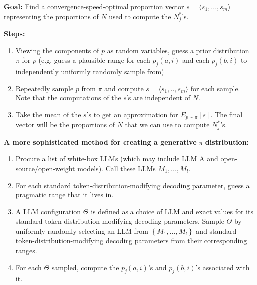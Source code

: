 \documentclass{article}
\begin{document}
\textbf{Goal: }Find a convergence-speed-optimal proportion vector $\displaystyle s=\langle s_{1} ,...,s_{m} \rangle $ representing the proportions of $\displaystyle N$ used to compute the $\displaystyle N_{j}^{*}$'s.

\textbf{Steps:}
\begin{enumerate}
\item Viewing the components of $\displaystyle p$ as random variables, guess a prior distribution $\displaystyle \pi $ for $\displaystyle p$ (e.g. guess a plausible range for each $\displaystyle p_{j}\left( a,i\right)$ and each $\displaystyle p_{j}\left( b,i\right)$ to independently uniformly randomly sample from)
\item Repeatedly sample $\displaystyle p$ from $\displaystyle \pi $ and compute $\displaystyle s=\langle s_{1} ,..,s_{m} \rangle $ for each sample. Note that the computations of the $\displaystyle s$'s are independent of $\displaystyle N$.
\item Take the mean of the $\displaystyle s$'s to get an approximation for $\displaystyle E_{p\sim \pi }\left[ s\right]$. The final vector will be the proportions of $\displaystyle N$ that we can use to compute $\displaystyle N_{j}^{*}$'s.
\end{enumerate}



\textbf{A more sophisticated method for creating a generative }$\displaystyle \pi $\textbf{ distribution:}
\begin{enumerate}
\item Procure a list of white-box LLMs (which may include LLM A and open-source/open-weight models). Call these LLMs $\displaystyle M_{1} ,...,M_{l}$.
\item For each standard token-distribution-modifying decoding parameter, guess a pragmatic range that it lives in.
\item A LLM configuration $\displaystyle \Theta $ is defined as a choice of LLM and exact values for its standard token-distribution-modifying decoding parameters. Sample $\displaystyle \Theta $ by uniformly randomly selecting an LLM from $\displaystyle \left\{M_{1} ,...,M_{l}\right\}$ and standard token-distribution-modifying decoding parameters from their corresponding ranges.
\item For each $\displaystyle \Theta $ sampled, compute the $\displaystyle p_{j}\left( a,i\right)$'s and $\displaystyle p_{j}\left( b,i\right)$'s associated with it.
\end{enumerate}
\end{document}
